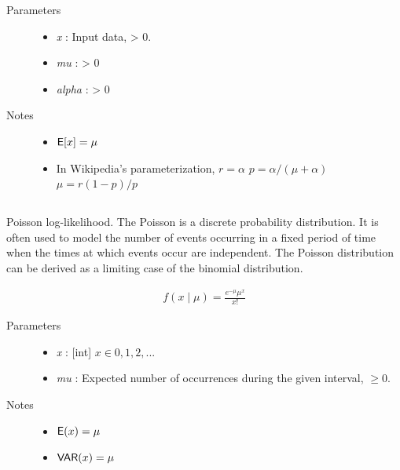 \documentclass[]{jss}
\begin{document}
\begin{description}
\item[Parameters] \leavevmode\begin{itemize}
\item {} 
\emph{x} : Input data, \textgreater{} 0.

\item {} 
\emph{mu} : \textgreater{} 0

\item {} 
\emph{alpha} : \textgreater{} 0

\end{itemize}

\item[Notes]\leavevmode\begin{itemize}
\item {} 
$\mathsf{E}[x]=\mu$

\item {} 
In Wikipedia's parameterization,
$r=\alpha$
$p=\alpha/(\mu+\alpha)$
$\mu=r(1-p)/p$

\end{itemize}


\end{description}

\subsection[Poisson]{}

Poisson log-likelihood. The Poisson is a discrete probability distribution.
It is often used to model the number of events occurring in a fixed period of
time when the times at which events occur are independent. The Poisson
distribution can be derived as a limiting case of the binomial distribution.

\begin{eqnarray*}
    f(x \mid \mu) = \frac{e^{-\mu}\mu^x}{x!}
\end{eqnarray*}

\begin{description}
\item[Parameters] \leavevmode\begin{itemize}
\item {} 
\emph{x} : {[}int{]} $x \in {0,1,2,...}$

\item {} 
\emph{mu} : Expected number of occurrences during the given interval, $\geq 0$.

\end{itemize}

\item[Notes]\leavevmode\begin{itemize}
\item {} 
$\mathsf{E}(x)=\mu$

\item {} 
$\mathsf{VAR}(x)=\mu$

\end{itemize}

\end{description}
\end{document}
